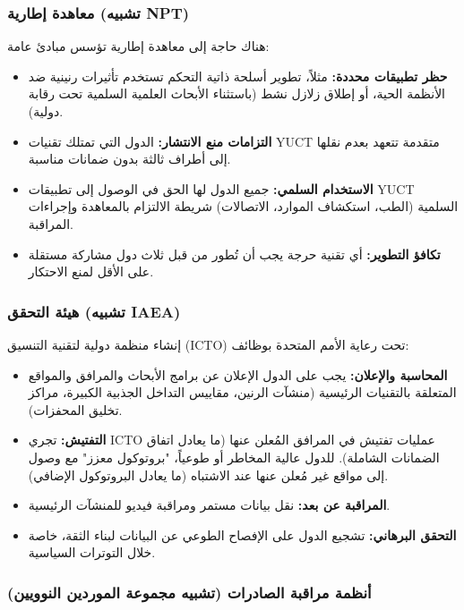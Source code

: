 \documentclass[12pt,a4paper]{article}
\theoremstyle{remark}
\begin{document}
	\subsubsection{معاهدة إطارية (تشبيه NPT)}
	
	هناك حاجة إلى معاهدة إطارية تؤسس مبادئ عامة:
	\begin{itemize}
		\item \textbf{حظر تطبيقات محددة:} مثلاً، تطوير أسلحة ذاتية التحكم تستخدم تأثيرات رنينية ضد الأنظمة الحية، أو إطلاق زلازل نشط (باستثناء الأبحاث العلمية السلمية تحت رقابة دولية).
		\item \textbf{التزامات منع الانتشار:} الدول التي تمتلك تقنيات YUCT متقدمة تتعهد بعدم نقلها إلى أطراف ثالثة بدون ضمانات مناسبة.
		\item \textbf{الاستخدام السلمي:} جميع الدول لها الحق في الوصول إلى تطبيقات YUCT السلمية (الطب، استكشاف الموارد، الاتصالات) شريطة الالتزام بالمعاهدة وإجراءات المراقبة.
		\item \textbf{تكافؤ التطوير:} أي تقنية حرجة يجب أن تُطور من قبل ثلاث دول مشاركة مستقلة على الأقل لمنع الاحتكار.
	\end{itemize}
	
	\subsubsection{هيئة التحقق (تشبيه IAEA)}
	
	إنشاء منظمة دولية لتقنية التنسيق (ICTO) تحت رعاية الأمم المتحدة بوظائف:
	\begin{itemize}
		\item \textbf{المحاسبة والإعلان:} يجب على الدول الإعلان عن برامج الأبحاث والمرافق والمواقع المتعلقة بالتقنيات الرئيسية (منشآت الرنين، مقاييس التداخل الجذبية الكبيرة، مراكز تخليق المحفزات).
		\item \textbf{التفتيش:} تجري ICTO عمليات تفتيش في المرافق المُعلن عنها (ما يعادل اتفاق الضمانات الشاملة). للدول عالية المخاطر أو طوعياً، "بروتوكول معزز" مع وصول إلى مواقع غير مُعلن عنها عند الاشتباه (ما يعادل البروتوكول الإضافي).
		\item \textbf{المراقبة عن بعد:} نقل بيانات مستمر ومراقبة فيديو للمنشآت الرئيسية.
		\item \textbf{التحقق البرهاني:} تشجيع الدول على الإفصاح الطوعي عن البيانات لبناء الثقة، خاصة خلال التوترات السياسية.
	\end{itemize}
	
	\subsubsection{أنظمة مراقبة الصادرات (تشبيه مجموعة الموردين النوويين)}
	
\end{document}
